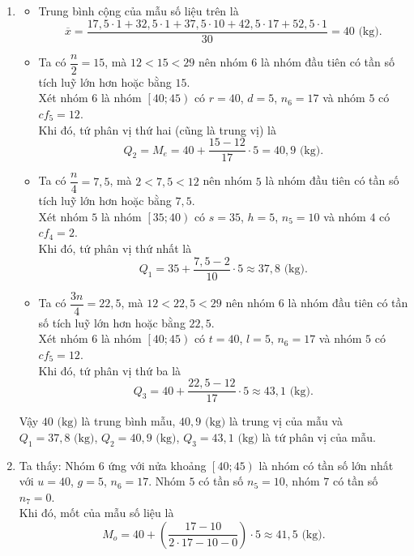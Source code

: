 \begin{bt}
{\begin{enumerate}
\begin{center}
			\end{center}
			\item 
			\begin{itemize}
				\item Trung bình cộng của mẫu số liệu trên là
				\[
				\overline{x} = \dfrac{17{,}5 \cdot 1 + 32{,}5 \cdot 1 + 37{,}5 \cdot 10+ 42{,}5 \cdot 17+ 52{,}5 \cdot 1}{30} = 	40\text{ (kg)}.
				\]
				\item Ta có $\dfrac{n}{2} = 15$, mà $12<15<29$ nên nhóm $6$ là nhóm đầu tiên có tần số tích luỹ lớn hơn hoặc bằng $15$. \\
				Xét nhóm $6$ là nhóm $\left[40;45\right)$ có $r=40$, $d=5$, $n_6=17$ và nhóm $5$ có $cf_5 = 12$.\\
				Khi đó, tứ phân vị thứ hai (cũng là trung vị) là
				\[
				Q_2 = M_e = 40 + \dfrac{15-12}{17} \cdot 5 = 40{,}9\text{ (kg)}.
				\]
				\item Ta có $\dfrac{n}{4} = 7{,}5$, mà $2<7{,}5<12$ nên nhóm $5$ là nhóm đầu tiên có tần số tích luỹ lớn hơn hoặc bằng $7{,}5$. \\
				Xét nhóm $5$ là nhóm $\left[35;40\right)$ có $s=35$, $h=5$, $n_5=10$ và nhóm $4$ có $cf_4 = 2$.\\
				Khi đó, tứ phân vị thứ nhất là
				\[
				Q_1 = 35 + \dfrac{7{,}5 - 2}{10} \cdot 5 \approx 37{,}8\text{ (kg)}.
				\]
				\item Ta có $\dfrac{3n}{4} = 22{,}5$, mà $12 < 22{,}5 <29$ nên nhóm $6$ là nhóm đầu tiên có tần số tích luỹ lớn hơn hoặc bằng $22{,}5$. \\
				Xét nhóm $6$ là nhóm $\left[40;45\right)$ có $t=40$, $l=5$, $n_6=17$ và nhóm $5$ có $cf_5 = 12$.\\
				Khi đó, tứ phân vị thứ ba là
				\[
				Q_3 = 40 + \dfrac{22{,}5 - 12}{17} \cdot 5 \approx 43{,}1\text{ (kg)}.
				\]
			\end{itemize}
			Vậy $40\text{ (kg)}$ là trung bình mẫu, $40{,}9\text{ (kg)}$ là trung vị của mẫu và $Q_1 = 37{,}8\text{ (kg)}$, $Q_2 = 40{,}9\text{ (kg)}$, $Q_3 = 43{,}1\text{ (kg)}$ là tứ phân vị của mẫu.
			\item Ta thấy: Nhóm $6$ ứng với nửa khoảng $\left[40;45\right)$ là nhóm có tần số lớn nhất với $u=40$, $g=5$, $n_6 = 17$. Nhóm $5$ có tần số $n_5 = 10$, nhóm $7$ có tần số $n_7 = 0$.\\
			Khi đó, mốt của mẫu số liệu là 
			\[
			M_o = 40 + \left( \dfrac{17 - 10}{2\cdot 17 - 10 - 0} \right) \cdot 5 \approx 41{,}5\text{ (kg)}.
			\]
		\end{enumerate}
	}
\end{bt}

